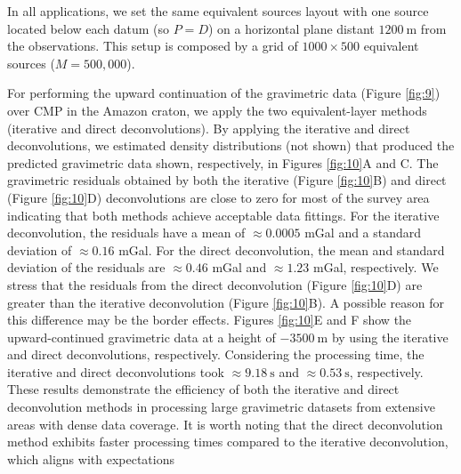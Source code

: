 
In all applications, we set the same equivalent sources layout with one source located below each datum
(so $P=D$) on a horizontal plane distant $1200 \: \mathrm{m}$ from the observations.
This setup is composed by a grid of $1000 \times 500$ equivalent sources ($M = 500,000$). 

For performing the upward continuation of the gravimetric data (Figure \ref{fig:9}) over CMP in the Amazon craton, we apply the two equivalent-layer methods (iterative and direct deconvolutions).
By applying the iterative and direct deconvolutions, we estimated density distributions (not shown)
that produced the predicted gravimetric data shown, respectively, in  Figures \ref{fig:10}A and C.
The gravimetric residuals obtained by  both the iterative (Figure \ref{fig:10}B) and
direct (Figure \ref{fig:10}D) deconvolutions are close to zero for most of the survey area
indicating that both methods achieve acceptable data fittings.
For the iterative deconvolution, the residuals have a mean of $\approx 0.0005$ mGal and a standard deviation 
of $\approx 0.16$ mGal.
For the direct deconvolution, the mean and standard deviation of the residuals are $\approx 0.46$ mGal and 
$\approx 1.23$ mGal, respectively. 
We stress that the residuals from the direct deconvolution (Figure \ref{fig:10}D) are greater than  
the iterative deconvolution (Figure \ref{fig:10}B).
A possible reason for this difference may be  the border effects.
Figures \ref{fig:10}E and F show the upward-continued gravimetric data at a height of $-3500 \: \mathrm{m}$
by using the iterative and direct deconvolutions, respectively.
Considering the processing time, the iterative and direct deconvolutions took  $\approx 9.18 \: \mathrm{s}$ and $\approx 0.53 \: \mathrm{s}$, respectively. 
These results demonstrate the efficiency of both the iterative and direct deconvolution methods in processing large gravimetric datasets from extensive areas with dense data coverage. 
It is worth noting that the direct deconvolution method exhibits faster processing times compared to the iterative deconvolution, which aligns with expectations

